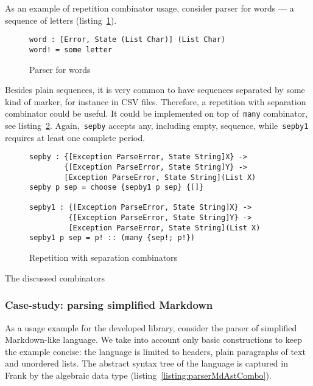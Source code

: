     As an example of repetition combinator usage, consider parser for words ---
    a sequence of letters (listing~\ref{listing:parserWordCombo}).

    \begin{figure}[h]
    \begin{lstlisting}
word : [Error, State (List Char)] (List Char)
word! = some letter
    \end{lstlisting}
    \caption{Parser for words}
    \label{listing:parserWordCombo}
    \end{figure}

    Besides plain sequences, it is very common to have sequences separated by some
    kind of marker, for instance in CSV files. Therefore, a repetition with separation
    combinator could be useful. It could be implemented on top of~\texttt{many}
    combinator, see listing~\ref{listing:parserSepbyCombo}. Again,~\texttt{sepby}
    accepts any, including empty, sequence, while~\texttt{sepby1} requires at least
    one complete period.

    \begin{figure}[h]
    \begin{lstlisting}
sepby : {[Exception ParseError, State String]X} ->
        {[Exception ParseError, State String]Y} ->
        [Exception ParseError, State String](List X)
sepby p sep = choose {sepby1 p sep} {[]}

sepby1 : {[Exception ParseError, State String]X} ->
         {[Exception ParseError, State String]Y} ->
         [Exception ParseError, State String](List X)
sepby1 p sep = p! :: (many {sep!; p!})
    \end{lstlisting}
    \caption{Repetition with separation combinators}
    \label{listing:parserSepbyCombo}
    \end{figure}

    The discussed combinators

    \subsubsection{Case-study: parsing simplified Markdown}

    As a usage example for the developed library, consider the
    parser of simplified Markdown-like language. We take into account only basic
    constructions to keep the example concise: the language is limited to headers,
    plain paragraphs of text and unordered lists. The abstract syntax tree of
    the language is captured in Frank by the algebraic data type
    (listing~\ref{listing:parserMdAstCombo}).


